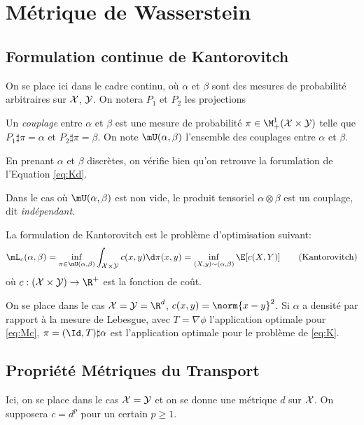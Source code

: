 \section{Métrique de Wasserstein}
\subsection{Formulation continue de Kantorovitch}
On se place ici dans le cadre continu, où $\alpha$ et $\beta$ sont des mesures de probabilité arbitraires sur $\mathcal{X}$, $\mathcal{Y}$.
On notera $P_{1}$ et $P_{2}$ les projections
\begin{definition}
	Un \emph{couplage} entre $\alpha$ et $\beta$ est une mesure de probabilité $\pi \in \M_{+}^{1}(\X \times \Y)$ telle que $P_{1} \sharp \pi = \alpha$ et $P_{2} \sharp \pi = \beta$.
	On note $\mU(\alpha, \beta)$ l'ensemble des couplages entre $\alpha$ et $\beta$.
\end{definition}
En prenant $\alpha$ et $\beta$ discrètes, on vérifie bien qu'on retrouve la forumlation de l'Equation \ref{eq:Kd}.
\begin{remarque}
	Dans le cas où $\mU(\alpha, \beta)$ est non vide, le produit tensoriel $\alpha \otimes \beta$ est un couplage, dit \emph{indépendant}.
\end{remarque}

\begin{definition}
	La formulation de Kantorovitch est le problème d'optimisation suivant:
	\begin{equation*}
		\mL_{c}(\alpha, \beta) = \inf_{\pi \in \mU(\alpha, \beta)} \int_{\X \times \Y}c(x, y)\d \pi(x, y) = \inf_{(X, y) \sim (\alpha, \beta)}\E[c(X, Y)] \tag{Kantorovitch}\label{eq:K}
	\end{equation*}
	où $c: (\X \times \Y) \to \R^{+}$ est la fonction de coût.
\end{definition}

\begin{proposition}
	On se place dans le cas $\X = \Y = \R^{d}$, $c(x, y) = \norm{x - y}^{2}$.
	Si $\alpha$ a densité par rapport à la mesure de Lebesgue, avec $T = \nabla \phi$ l'application
	optimale pour \ref{eq:Mc}, $\pi = (\Id, T) \sharp \alpha$ est l'application optimale pour le problème
	de \ref{eq:K}.
\end{proposition}

\subsection{Propriété Métriques du Transport}
Ici, on se place dans le cas $\mathcal{X} = \mathcal{Y}$ et on se donne une métrique $d$ sur $\mathcal{X}$.
On supposera $c = d^{p}$ pour un certain $p \geq 1$.

